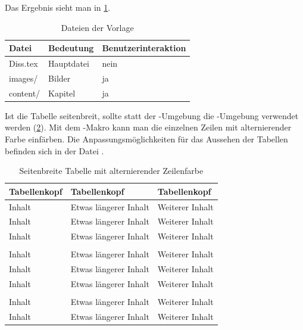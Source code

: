 Das Ergebnis sieht man in \cref{tab:tabellenbeispiel}.

\begin{table}%
	\tablestylecommon%
	\caption{Dateien der Vorlage}%
	\label{tab:tabellenbeispiel}%
	\begin{tabular}{l l l}%
		\toprule%
		Datei       &  Bedeutung    &  Benutzerinteraktion \\%
		\midrule%
		Diss.tex  &  Hauptdatei   &  nein     \\%
		images/   &  Bilder       &  ja       \\%
		content/  &  Kapitel      &  ja       \\%
		\bottomrule%
	\end{tabular}%
\end{table}

Ist die Tabelle seitenbreit, sollte statt der -Umgebung die -Umgebung verwendet werden (\cref{tab:AlternierendeZeilenfarben}).
Mit dem -Makro kann man die einzelnen Zeilen mit alternierender Farbe einfärben.
Die Anpassungsmöglichkeiten für das Aussehen der Tabellen befinden sich in der Datei .

\begin{table}%
\tablestylealtcolored%
\caption{Seitenbreite Tabelle mit alternierender Zeilenfarbe}%
\label{tab:AlternierendeZeilenfarben}%
	\begin{tabularx}{\linewidth}{llX}%
		\toprule%
		\rowcolor{tableheadcolor}%
		\tableheadfont Tabellenkopf &	\tableheadfont Tabellenkopf & \tableheadfont Tabellenkopf 
		\tabularnewline%
		\midrule%
		Inhalt  & Etwas längerer Inhalt & Weiterer Inhalt \tabularnewline
		Inhalt  & Etwas längerer Inhalt & Weiterer Inhalt \tabularnewline
		Inhalt  & Etwas längerer Inhalt & Weiterer Inhalt \tabularnewline
		\rowcolor{tablesubheadcolor}%
		\multicolumn{3}{l}{\bfseries\color{KITblue} Zwischenkopfzeile}%
		\tabularnewline%
		Inhalt  & Etwas längerer Inhalt & Weiterer Inhalt \tabularnewline
		Inhalt  & Etwas längerer Inhalt & Weiterer Inhalt \tabularnewline
		Inhalt  & Etwas längerer Inhalt & Weiterer Inhalt \tabularnewline
		\rowcolor{tablesubheadcolor}%
		\multicolumn{3}{l}{\bfseries\color{KITgreen} Zwischenkopfzeile}%
		\tabularnewline
		Inhalt  & Etwas längerer Inhalt & Weiterer Inhalt \tabularnewline%
		Inhalt  & Etwas längerer Inhalt & Weiterer Inhalt \tabularnewline%
		\bottomrule%
	\end{tabularx}%
\end{table}

